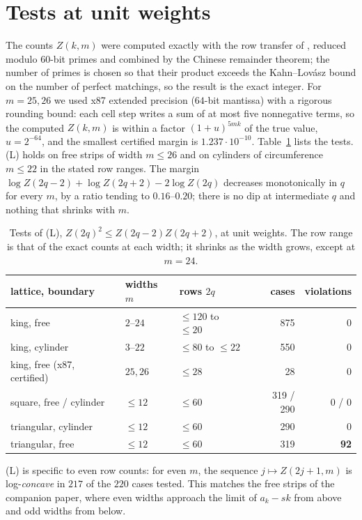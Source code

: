 \documentclass[11pt]{amsart}
\theoremstyle{definition}
\theoremstyle{remark}
\begin{document}
\section{Tests at unit weights}\label{sec:tests}

The counts $Z(k, m)$ were computed exactly with the row transfer of \cite{rylko2026entropy},
reduced modulo $60$-bit primes and combined by the Chinese remainder theorem; the number of primes
is chosen so that their product exceeds the Kahn--Lov\'asz bound on the number of perfect matchings,
so the result is the exact integer. For $m = 25, 26$ we used x87 extended precision ($64$-bit
mantissa) with a rigorous rounding bound: each cell step writes a sum of at most five nonnegative
terms, so the computed $Z(k, m)$ is within a factor $(1 + u)^{5mk}$ of the true value,
$u = 2^{-64}$, and the smallest certified margin is $1.237\cdot10^{-10}$. Table~\ref{tab:L} lists the
tests. (L) holds on free strips of width $m \le 26$ and on cylinders of circumference $m \le 22$ in
the stated row ranges. The margin $\log Z(2q-2) + \log Z(2q+2) - 2\log Z(2q)$ decreases monotonically
in $q$ for every $m$, by a ratio tending to $0.16$--$0.20$; there is no dip at intermediate $q$ and
nothing that shrinks with $m$.

\begin{table}[ht]
\caption{Tests of (L), $Z(2q)^2 \le Z(2q-2)Z(2q+2)$, at unit weights. The row range is that of the exact
counts at each width; it shrinks as the width grows, except at $m = 24$.}\label{tab:L}
\begin{tabular}{lllrr}
\toprule
lattice, boundary & widths $m$ & rows $2q$ & cases & violations \\
\midrule
king, free     & $2$--$24$  & $\le 120$ to $\le 20$ & 875 & 0 \\
king, cylinder & $3$--$22$  & $\le 80$ to $\le 22$  & 550 & 0 \\
king, free (x87, certified) & $25, 26$ & $\le 28$ & 28 & 0 \\
square, free / cylinder     & $\le 12$ & $\le 60$ & 319 / 290 & 0 / 0 \\
triangular, cylinder        & $\le 12$ & $\le 60$ & 290 & 0 \\
triangular, free            & $\le 12$ & $\le 60$ & 319 & \textbf{92} \\
\bottomrule
\end{tabular}
\end{table}

(L) is specific to even row counts: for even $m$, the sequence $j \mapsto Z(2j + 1, m)$ is
log-\emph{concave} in $217$ of the $220$ cases tested. This matches the free strips of the
companion paper, where even widths approach the limit of $a_k - sk$ from above and odd widths from
below.
\end{document}
